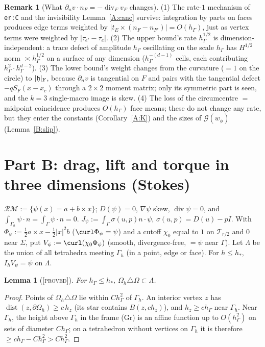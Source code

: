 \documentclass[11pt,reqno]{amsart}
\theoremstyle{plain}
\newtheorem{lemma}[theorem]{Lemma}
\theoremstyle{definition}
\newtheorem{remark}[theorem]{Remark}
\newcommand{\status}[1]{\textup{\textsc{[#1]}}}
\newcommand{\hG}{h_\Gamma}
\newcommand{\Gh}{\Gamma_h}
\newcommand{\Oh}{\Omega_h}
\newcommand{\dn}{\partial_n}
\renewcommand{\div}{\operatorname{div}}
\newcommand{\Gc}{\mathcal G}
\newcommand{\hh}{\mathfrak h}
\newcommand{\RM}{\mathcal{RM}}
\DeclareMathOperator{\dist}{dist}
\begin{document}
\begin{remark}[What $\dn v\cdot n_F=-\div_Fv_F$ changes]\label{A:rem:diff}
(1) The rate-$1$ mechanism of \texttt{er:C} and the invisibility Lemma~\ref{A:canc} survive: integration by parts on faces produces edge terms weighted by $|t_E\times(n_F-n_{F'})|=O(\hG)$, just as vertex terms were weighted by $|\tau_{e'}-\tau_e|$.
(2) The upper bound's rate $\hG^{1/2}$ is dimension-independent: a trace defect of amplitude $\hG$ oscillating on the scale $\hG$ has $H^{1/2}$ norm $\asymp\hG^{1/2}$ on a surface of any dimension ($\hG^{-(d-1)}$ cells, each contributing $\hG^2\cdot\hG^{d-2}$).
(3) The lower bound's weight changes from the curvature ($=1$ on the circle) to $|\hh|_{\rm F}$, because $\dn v$ is tangential on $F$ and pairs with the tangential defect $-qS_F(x-x_c)$ through a $2\times2$ moment matrix; only its symmetric part is seen, and the $k=3$ single-macro image is skew.
(4) The loss of the circumcentre $=$ midpoint coincidence produces $O(\hG)$ face means; these do not change any rate, but they enter the constants (Corollary~\ref{A:K}) and the sizes of $\Gc(w_\phi)$ (Lemma~\ref{B:slip}).
\end{remark}

\section{Part B: drag, lift and torque in three dimensions (Stokes)}\label{sec:B}
$\RM:=\{\psi(x)=a+b\times x\}$; $D(\psi)=0$, $\nabla\psi$ skew, $\div\psi=0$, and $\int_{\Gh}\psi\cdot n=\int_\Gamma\psi\cdot n=0$. $J_\psi:=\int_\Gamma\sigma(u,p)n\cdot\psi$, $\sigma(u,p)=D(u)-pI$. With $\Phi_\psi:=\frac12a\times x-\frac12|x|^2b$ ($\curl\Phi_\psi=\psi$) and a cutoff $\chi_0$ equal to $1$ on $\mathcal T_{r/2}$ and $0$ near $\Sigma$, put $V_\psi:=\curl(\chi_0\Phi_\psi)$ (smooth, divergence-free, $=\psi$ near $\Gamma$). Let $\Lambda$ be the union of all tetrahedra meeting $\Gh$ (in a point, edge or face). For $h\le h_\ast$, $I_hV_\psi=\psi$ on $\Lambda$.

\begin{lemma}[\status{proved}]\label{B:strip}
For $\hG\le h_\ast$, $\Oh\triangle\Omega\subset\Lambda$.
\end{lemma}
\begin{proof}
Points of $\Oh\triangle\Omega$ lie within $C\hG^2$ of $\Gh$. An interior vertex $z$ has $\dist(z,\partial\Oh)\ge c\,h_z$ (its star contains $B(z,ch_z)$), and $h_z\ge c\hG$ near $\Gh$. Near $\Gh$, the height above $\Gh$ in the frame (Gr) is an affine function up to $O(\hG^2)$ on sets of diameter $C\hG$; on a tetrahedron without vertices on $\Gh$ it is therefore $\ge c\hG-C\hG^2>C\hG^2$.
\end{proof}
\end{document}
